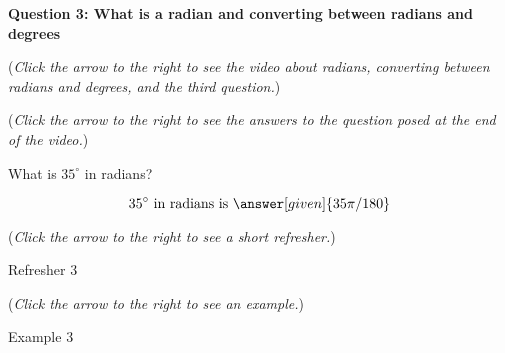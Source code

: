 \documentclass{ximera}
\begin{document}
\textbf{Question 3: What is a radian and converting between radians and degrees}
\begin{question}
\begin{flushright}
{\color{blue}(\emph{Click the arrow to the right to see the video about radians, converting between radians and degrees, and the third question.})}
\end{flushright}
\begin{center}
\begin{expandable}
{\color{blue}(\emph{Click the arrow to the right to see the answers 
to the question posed at the end of the video.})}
\begin{expandable}
What is $35^\circ$ in radians?
\begin{prompt}
\[
35^\circ\text{ in radians is }\answer[given]{35 \pi / 180}
\]
\end{prompt}
\begin{flushright}
{\color{blue}(\emph{Click the arrow to the right to see a short refresher.})}
\end{flushright}
\begin{expandable}
Refresher 3
\end{expandable}
\begin{flushright}
{\color{blue}(\emph{Click the arrow to the right to see an example.})}
\end{flushright}
\begin{expandable}
Example 3
\end{expandable}
\end{expandable}
\end{expandable}
\end{center}
\end{question}
\end{document}
